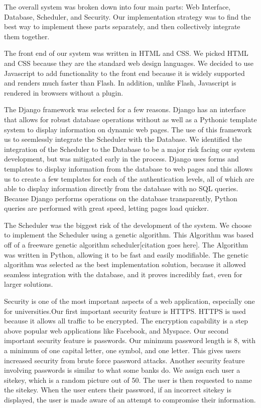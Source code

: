 \documentclass[12pt]{article}
\begin{document}
\begin{enumerate}
 The overall system was broken down into four main parts: Web Interface, Database, Scheduler, and Security. Our implementation strategy was to find the best way to implement these parts separately, and then collectively integrate them together.

The front end of our system was written in HTML and CSS. We picked HTML and CSS because they are the standard web design languages. We decided to use Javascript to add functionality to the front end because it is widely supported and renders much faster than Flash. In addition, unlike Flash, Javascript is rendered in browsers without a plugin.

The Django framework was selected for a few reasons. Django has an interface that allows for robust database operations without as well as a Pythonic template system to display information on dynamic web pages. The use of this framework us to seemlessly integrate the Scheduler with the Database. We identified the integration of the Scheduler to the Database to be a major risk facing our system development, but was mitigated early in the process. Django uses forms and templates to display information from the database to web pages and this allows us to create a few templates for each of the authentication levels, all of which are able to display information directly from the database with no SQL queries. Because Django performs operations on the database transparently, Python queries are performed with great speed, letting pages load quicker. %

The Scheduler was the biggest risk of the development of the system. We choose to implement the Scheduler using a genetic algorithm. This Algorithm was based off of a freeware genetic algorithm scheduler[citation goes here]. The Algorithm was written in Python, allowing it to be fast and easily modifiable. The genetic algorithm was selected as the best implementation solution, because it allowed seamless integration with the database, and it proves incredibly fast, even for larger solutions.%

Security is one of the most important aspects of a web application, especially one for universities.Our first important security feature is HTTPS. HTTPS is used because it allows all traffic to be encrypted. The encryption capability is a step above popular web applications like Facebook, and Myspace. Our second important security feature is passwords. Our minimum password length is 8, with a minimum of one capital letter, one symbol, and one letter. This gives users increased security from brute force password attacks. Another security feature involving passwords is similar to what some banks do. We assign each user a sitekey, which is a random picture out of 50. The user is then requested to name the sitekey. When the user enters their password, if an incorrect sitekey is displayed, the user is made aware of an attempt to compromise their information. 


\end{enumerate}
\end{document}
